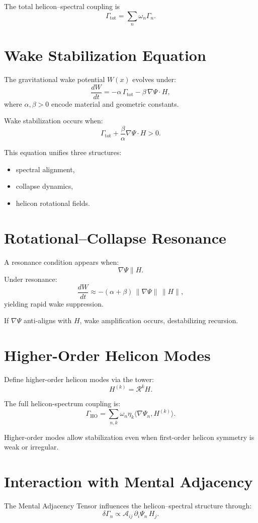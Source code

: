 The total helicon–spectral coupling is
\[
\Gamma_{\mathrm{tot}} = \sum_n \omega_n \Gamma_n.
\]

\section{Wake Stabilization Equation}
The gravitational wake potential $W(x)$ evolves under:
\[
\frac{dW}{dt} = -\alpha\, \Gamma_{\mathrm{tot}} - \beta\, \nabla \Psi \cdot H,
\]
where $\alpha,\beta > 0$ encode material and geometric constants.

Wake stabilization occurs when:
\[
\Gamma_{\mathrm{tot}} + \frac{\beta}{\alpha} \nabla \Psi \cdot H > 0.
\]

This equation unifies three structures:
\begin{itemize}
  \item spectral alignment,
  \item collapse dynamics,
  \item helicon rotational fields.
\end{itemize}

\section{Rotational–Collapse Resonance}
A resonance condition appears when:
\[
\nabla \Psi \parallel H.
\]
Under resonance:
\[
\frac{dW}{dt} \approx -(\alpha+\beta)\, \|\nabla \Psi\|\, \|H\|,
\]
yielding rapid wake suppression.

If $\nabla \Psi$ anti-aligns with $H$, wake amplification occurs, destabilizing recursion.

\section{Higher-Order Helicon Modes}
Define higher-order helicon modes via the tower:
\[
H^{(k)} = \mathcal{R}^k H.
\]

The full helicon-spectrum coupling is:
\[
\Gamma_{\mathrm{HO}} = \sum_{n,k} \omega_n \eta_k \langle \nabla \Psi_n, H^{(k)} \rangle.
\]

Higher-order modes allow stabilization even when first-order helicon symmetry is weak or irregular.

\section{Interaction with Mental Adjacency}
The Mental Adjacency Tensor influences the helicon–spectral structure through:
\[
\delta \Gamma_n \propto \mathcal{A}_{ij} \, \partial_i \Psi_n \, H_j.
\]

